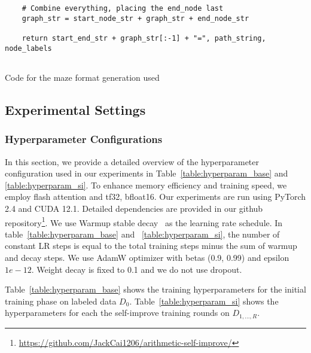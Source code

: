 \begin{listing}
\begin{verbatim}
    # Combine everything, placing the end_node last
    graph_str = start_node_str + graph_str + end_node_str

    return start_end_str + graph_str[:-1] + "=", path_string, node_labels
    
\end{verbatim}
\caption{Code for the maze format generation used}
\label{listing:code_maze_generation}
\end{listing}


\newpage
\subsection{Experimental Settings}\label{sec:appendix_setting}

\subsubsection{Hyperparameter Configurations}

In this section, we provide a detailed overview of the hyperparameter configuration used in our experiments in Table~\ref{table:hyperparam_base} and \ref{table:hyperparam_si}. To enhance memory efficiency and training speed, we employ flash attention and tf32, bfloat16. Our experiments are run using PyTorch 2.4 and CUDA 12.1. Detailed dependencies are provided in our github repository\footnote{\url{https://github.com/JackCai1206/arithmetic-self-improve/}}. We use Warmup stable decay~\citep{wen2024understanding} as the learning rate schedule. In table~\ref{table:hyperparam_base} and ~\ref{table:hyperparam_si}, the number of constant LR steps is equal to the total training steps minus the sum of warmup and decay steps. We use AdamW optimizer with betas (0.9, 0.99) and epsilon $1e-12$. Weight decay is fixed to 0.1 and we do not use dropout. 

Table~\ref{table:hyperparam_base} shows the training hyperparameters for the initial training phase on labeled data $D_0$. Table~\ref{table:hyperparam_si} shows the hyperparameters for each the self-improve training rounds on $D_{1,\dots,R}$. 

